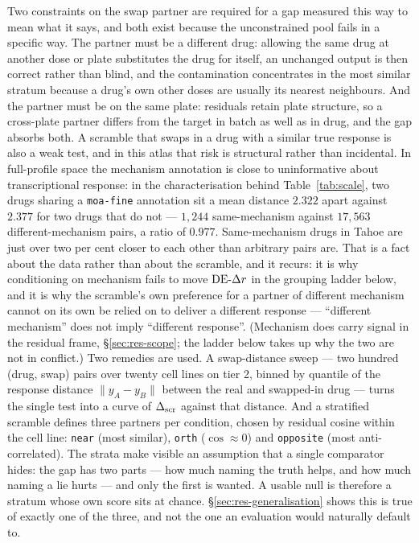 Two constraints on the swap partner are required for a gap measured this way to mean what it says,
and both exist because the unconstrained pool fails in a specific way. The partner must be a
different drug: allowing the same drug at another dose or plate substitutes the drug for itself, an
unchanged output is then correct rather than blind, and the contamination concentrates in the most
similar stratum because a drug's own other doses are usually its nearest neighbours. And the partner
must be on the same plate: residuals retain plate structure, so a cross-plate partner differs from
the target in batch as well as in drug, and the gap absorbs both. A scramble that swaps in a drug
with a similar true response is also a weak test, and in this atlas that risk is structural rather
than incidental. In full-profile space the mechanism annotation is close to uninformative about
transcriptional response: in the characterisation behind Table~\ref{tab:scale}, two drugs sharing a
\texttt{moa-fine} annotation sit a mean distance $2.322$ apart against $2.377$ for two drugs that do
not --- $1{,}244$ same-mechanism against $17{,}563$ different-mechanism pairs, a ratio of $0.977$.
Same-mechanism drugs in Tahoe are just over two per cent closer to each other than arbitrary pairs
are. That is a fact about the data rather than about the scramble, and it recurs: it is why
conditioning on mechanism fails to move $\textrm{DE-}\Delta r$ in the grouping ladder below, and it is why the
scramble's own preference for a partner of different mechanism cannot on its own be relied on to
deliver a different response --- ``different mechanism'' does not imply ``different response''.
(Mechanism does carry signal in the residual frame, \S\ref{sec:res-scope}; the ladder below takes up
why the two are not in conflict.) Two remedies are used. A swap-distance sweep --- two hundred (drug, swap) pairs over
twenty cell lines on tier 2, binned by quantile of the response distance $\lVert y_A - y_B \rVert$
between the real and swapped-in drug --- turns the single test into a curve of $\Delta_{\textrm{scr}}$ against that
distance. And a stratified scramble defines three partners per condition, chosen by residual cosine
within the cell line: \texttt{near} (most similar), \texttt{orth} ($\cos\approx0$) and
\texttt{opposite} (most anti-correlated). The strata make visible an assumption that a single
comparator hides: the gap has two parts --- how much naming the truth helps, and how much naming a
lie hurts --- and only the first is wanted. A usable null is therefore a stratum whose own score
sits at chance. \S\ref{sec:res-generalisation} shows this is true of exactly one of the three, and
not the one an evaluation would naturally default to.

